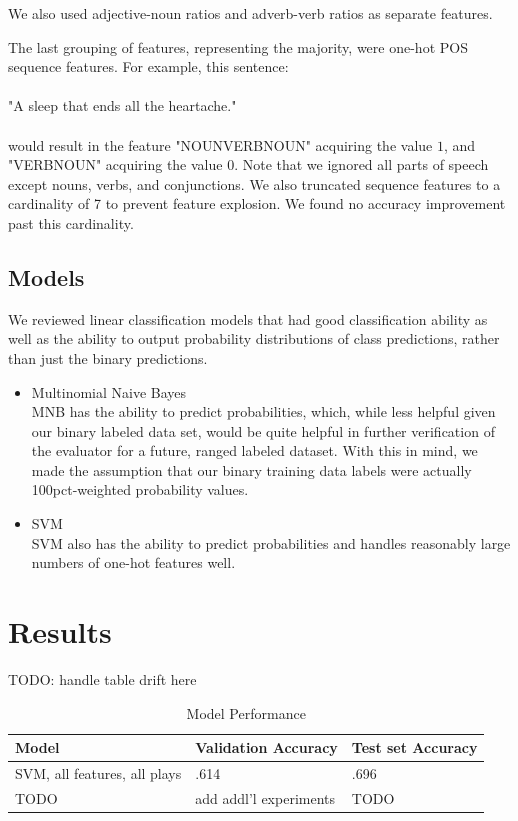 \documentclass[letterpaper, 10 pt, conference]{ieeeconf}  %
\begin{document}
We also used adjective-noun ratios and adverb-verb ratios as separate features.

The last grouping of features, representing the majority, were one-hot POS sequence features. For example, this sentence: 
\\
\\
"A sleep that ends all the heartache."
\\
\\
would result in the feature "NOUN\textunderscore VERB\textunderscore NOUN" acquiring the value $1$, and "VERB\textunderscore NOUN" acquiring the value $0$. Note that we ignored all parts of speech except nouns, verbs, and conjunctions. We also truncated sequence features to a cardinality of 7 to prevent feature explosion. We found no accuracy improvement past this cardinality.


\subsection{Models}
We reviewed linear classification models that had good classification ability as well as the ability to output probability distributions of class predictions, rather than just the binary predictions.

    \begin{itemize}
      \item{Multinomial Naive Bayes} \\
      MNB has the ability to predict probabilities, which, while less helpful given our binary labeled data set, would be quite helpful in further verification of the evaluator for a future, ranged labeled dataset. With this in mind, we made the assumption that our binary training data labels were actually 100pct-weighted probability values. 
      \item{SVM}\\
      SVM also has the ability to predict probabilities and handles reasonably large numbers of one-hot features well.
    \end{itemize}
 

  \section{Results}
    TODO: handle table drift here
    \begin{table}[h]
      \caption{Model Performance}
      \label{table_example}
      \begin{center}
        \begin{tabular}{| p{2cm}  | p{2cm} | | p{2cm} }
        \hline
        Model & Validation Accuracy & Test set Accuracy\\
        \hline
        SVM, all features, all plays & .614 & .696\\
        \hline
        TODO & add addl'l experiments & TODO \\
        \hline
        \end{tabular}
      \end{center}
    \end{table}
\end{document}
